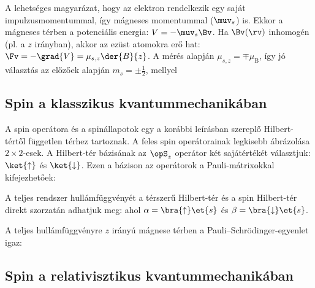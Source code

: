    A lehetséges magyarázat, hogy az elektron rendelkezik egy saját impulzusmomentummal, így mágneses momentummal ($\muv_s$) is.
   Ekkor a mágneses térben a potenciális energia: $V=-\muv_s \Bv$.
   Ha $\Bv(\rv)$ inhomogén (pl. a $z$ irányban), akkor az ezüst atomokra erő hat: $\Fv=-\grad{V}=\mu_{s,z}\der{B}{z}$.
   A mérés alapján $\mu_{s,z}=\mp\mu_\text{B}$, így jó választás az előzőek alapján $m_s=\pm\frac{1}{2}$, mellyel
   
  \subsection{Spin a klasszikus kvantummechanikában}
   
   A spin operátora és a spinállapotok egy a korábbi leírásban szereplő Hilbert-tértől független térhez tartoznak.
   A feles spin operátorainak legkisebb ábrázolása $2\times2$-esek.
   A Hilbert-tér bázisának az $\opS_z$ operátor két sajátértékét választjuk: $\ket{\uparrow}$ és $\ket{\downarrow}$.  Ezen a bázison az operátorok a Pauli-mátrixokkal kifejezhetőek: 
   
   A teljes rendszer hullámfüggvényét a térszerű Hilbert-tér és a spin Hilbert-tér direkt szorzatán adhatjuk meg: 
   ahol $\alpha=\bra{\uparrow}\et{s}$ és $\beta=\bra{\downarrow}\et{s}$.
   
   A teljes hullámfüggvényre $z$ irányú mágnese térben a Pauli--Schrödinger-egyenlet igaz:
   
  \subsection{Spin a relativisztikus kvantummechanikában}
   
